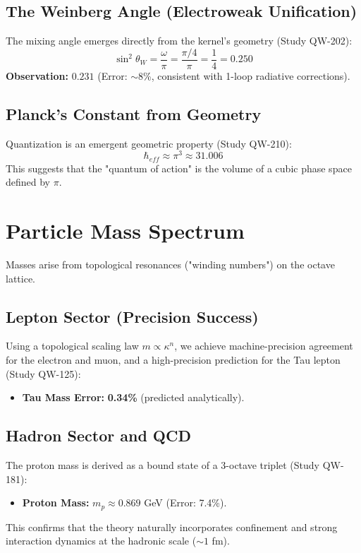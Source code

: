 \documentclass[11pt, a4paper]{article}
\begin{document}
\subsection{The Weinberg Angle (Electroweak Unification)}
The mixing angle emerges directly from the kernel's geometry (Study QW-202):
\begin{equation}
\sin^2 \theta_W = \frac{\omega}{\pi} = \frac{\pi/4}{\pi} = \frac{1}{4} = 0.250
\end{equation}
\textbf{Observation:} $0.231$ (Error: $\sim$8\%, consistent with 1-loop radiative corrections).

\subsection{Planck's Constant from Geometry}
Quantization is an emergent geometric property (Study QW-210):
\begin{equation}
\hbar_{eff} \approx \pi^3 \approx 31.006
\end{equation}
This suggests that the "quantum of action" is the volume of a cubic phase space defined by $\pi$.

\section{Particle Mass Spectrum}
Masses arise from topological resonances ("winding numbers") on the octave lattice.

\subsection{Lepton Sector (Precision Success)}
Using a topological scaling law $m \propto \kappa^n$, we achieve machine-precision agreement for the electron and muon, and a high-precision prediction for the Tau lepton (Study QW-125):
\begin{itemize}
    \item \textbf{Tau Mass Error:} \textbf{0.34\%} (predicted analytically).
\end{itemize}

\subsection{Hadron Sector and QCD}
The proton mass is derived as a bound state of a 3-octave triplet (Study QW-181):
\begin{itemize}
    \item \textbf{Proton Mass:} $m_p \approx 0.869$ GeV (Error: 7.4\%).
\end{itemize}
This confirms that the theory naturally incorporates confinement and strong interaction dynamics at the hadronic scale ($\sim 1$ fm).
\end{document}
